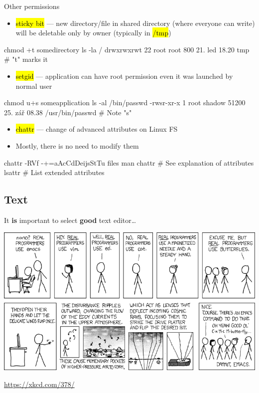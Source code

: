 \documentclass[compress, ucs, xelatex, 11pt, xcolor=svgnames,
  hyperref={
    bookmarks=true,
    unicode=true,
    colorlinks=true,
    pdftitle={Linux, command line and MetaCentrum},
    plainpages=false,
    pdfauthor={Vojtech Zeisek},
    pdfsubject={Course about use of Linux command line, writing shell scripts and using MetaCentrum of CESNET},
    pdfcreator={XeLaTeX},
    pdfkeywords={Linux, GNU, BASH, shell, command line, MetaCentrum},
    linkcolor=DarkRed,
    anchorcolor=DarkBlue,
    citecolor=Indigo,
    filecolor=NavyBlue,
    menucolor=DarkMagenta,
    urlcolor=DarkBlue,
    pdftex},
  url={hyphens, lowtilde} %
  ]{beamer}
\renewcommand{\texttt}[1]{\hl{\ttfamily #1}}
\begin{document}
\begin{frame}[fragile]{Other permissions}
  \begin{itemize}
    \item \texttt{sticky bit} --- new directory/file in shared directory (where everyone can write) will be deletable only by owner (typically in \texttt{/tmp})
  \end{itemize}
  \begin{bashcode}
    chmod +t somedirectory
    ls -la /
    drwxrwxrwt 22 root root 800 21. led 18.20 tmp # "t" marks it
  \end{bashcode}
  \begin{itemize}
    \item \texttt{setgid} --- application can have root permission even it was launched by normal user
  \end{itemize}
  \begin{bashcode}
    chmod u+s someapplication
    ls -al /bin/passwd
    -rwsr-xr-x 1 root shadow 51200 25. zář 08.38 /usr/bin/passwd # Note "s"
  \end{bashcode}
  \begin{itemize}
    \item \texttt{chattr} --- change of advanced attributes on Linux FS
    \item Mostly, there is no need to modify them
  \end{itemize}
  \begin{bashcode}
    chattr -RVf -+=aAcCdDeijsStTu files
    man chattr # See explanation of attributes
    lsattr # List extended attributes
  \end{bashcode}
\end{frame}

\subsection{Text}

\begin{frame}{It \textbf{is} important to select \textbf{good} text editor\ldots}
  \begin{center}
    \includegraphics[width=\textwidth-1cm]{real_programmers.png}
  \end{center}
  \begin{flushright}
    \url{https://xkcd.com/378/}
  \end{flushright}
\end{frame}
\end{document}
